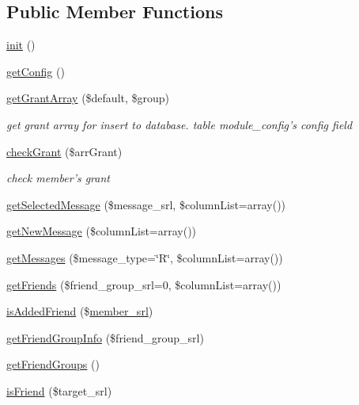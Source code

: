 \subsection*{Public Member Functions}
\begin{DoxyCompactItemize}
\item 
\hyperlink{classcommunicationModel_adff18c028fa89afeb6d7898fde5e2f91}{init} ()
\item 
\hyperlink{classcommunicationModel_ac19b1522d651d098b2d1a6f449a7b340}{get\+Config} ()
\item 
\hyperlink{classcommunicationModel_ac6a10f54e04888eed46f8fdd47b0d872}{get\+Grant\+Array} (\$default, \$group)
\begin{DoxyCompactList}\small\item\em get grant array for insert to database. table module\+\_\+config's config field \end{DoxyCompactList}\item 
\hyperlink{classcommunicationModel_ab4bd61605c27b1777d6322321dd3e421}{check\+Grant} (\$arr\+Grant)
\begin{DoxyCompactList}\small\item\em check member's grant \end{DoxyCompactList}\item 
\hyperlink{classcommunicationModel_a0224512523716ab204f6b91bea82aee4}{get\+Selected\+Message} (\$message\+\_\+srl, \$column\+List=array())
\item 
\hyperlink{classcommunicationModel_a2cc43556cb87f844b82814c2f49000bc}{get\+New\+Message} (\$column\+List=array())
\item 
\hyperlink{classcommunicationModel_ad742daa2376c03b70c5bf6389b10bfe7}{get\+Messages} (\$message\+\_\+type=\char`\"{}R\char`\"{}, \$column\+List=array())
\item 
\hyperlink{classcommunicationModel_a60f69cea7946be0bf4e874f2a5ab2c23}{get\+Friends} (\$friend\+\_\+group\+\_\+srl=0, \$column\+List=array())
\item 
\hyperlink{classcommunicationModel_a47441e7b20018de3fc6ab52bfb9b0d73}{is\+Added\+Friend} (\$\hyperlink{ko_8install_8php_aa61f9e08f0fe505094d26f8143f30bbd}{member\+\_\+srl})
\item 
\hyperlink{classcommunicationModel_a4ccd810d8c48ef4856da8fe986beb60a}{get\+Friend\+Group\+Info} (\$friend\+\_\+group\+\_\+srl)
\item 
\hyperlink{classcommunicationModel_a670b024aba464aee04e81fd2ae846fc5}{get\+Friend\+Groups} ()
\item 
\hyperlink{classcommunicationModel_a4e291316d5021ded0725169ada2a5dda}{is\+Friend} (\$target\+\_\+srl)
\end{DoxyCompactItemize}
